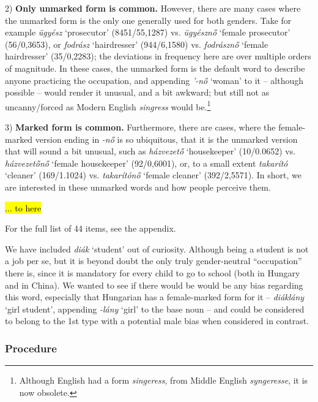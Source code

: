 \documentclass[11pt]{article}
\begin{document}
2) \textbf{Only unmarked form is common.} However, there are many cases where the unmarked form is the only one generally used for both genders. Take for example \textit{ügyész} `prosecutor' (8451/55,1287) vs. \textit{ügyésznő} `female prosecutor' (56/0,3653), or \textit{fodrász} `hairdresser' (944/6,1580) vs. \textit{fodrásznő} `female hairdresser' (35/0,2283); the deviations in frequency here are over multiple orders of magnitude. In these cases, the unmarked form is the default word to describe anyone practicing the occupation, and appending \textit{'-nő} `woman' to it -- although possible -- would render it unusual, and a bit awkward; but still not as uncanny/forced as Modern English \textit{singress} would be.\footnote{Although English had a form \textit{singeress}, from Middle English \textit{syngeresse}, it is now obsolete.}


3) \textbf{Marked form is common.} Furthermore, there are cases, where the female-marked version ending in \textit{-nő} is so ubiquitous, that it is the unmarked version that will sound a bit unusual, such as \textit{házvezető} `housekeeper' (10/0.0652) vs. \textit{házvezetőnő} `female housekeeper' (92/0,6001), or, to a small extent \textit{takarító} `cleaner' (169/1.1024) vs. \textit{takarítónő} `female cleaner' (392/2,5571). In short, we are interested in these unmarked words and how people perceive them.

\hl{... to here}

For the full list of 44 items, see the appendix. 



We have included \textit{diák} `student' out of curiosity. Although being a student is not a job per se, but it is beyond doubt the only truly gender-neutral ``occupation'' there is, since it is mandatory for every child to go to school (both in Hungary and in China). We wanted to see if there would be would be any bias regarding this word, especially that Hungarian has a female-marked form for it -- \textit{diáklány} `girl student', appending \textit{-lány} `girl' to the base noun -- and could be considered to belong to the 1st type with a potential male bias when considered in contrast.

\subsubsection{Procedure}
\end{document}
